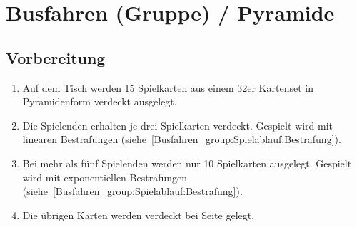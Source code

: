 \chapter{Busfahren (Gruppe) / Pyramide}
\section{Vorbereitung}
\begin{enumerate}[label={(\arabic*)}]
    \item Auf dem Tisch werden 15 Spielkarten aus einem 32er Kartenset in Pyramidenform verdeckt ausgelegt.
    \item Die Spielenden erhalten je drei Spielkarten verdeckt. Gespielt wird mit linearen Bestrafungen (siehe~\ref{Busfahren_group:Spielablauf:Bestrafung}).
    \item Bei mehr als fünf Spielenden werden nur 10 Spielkarten ausgelegt. Gespielt wird mit exponentiellen Bestrafungen (siehe~\ref{Busfahren_group:Spielablauf:Bestrafung}).
    \item Die übrigen Karten werden verdeckt bei Seite gelegt.
\end{enumerate}

